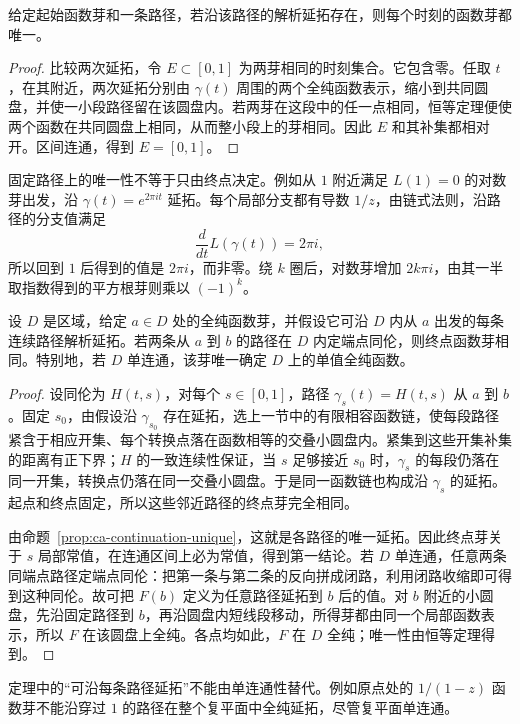\begin{proposition}[固定路径上的唯一性]
\label{prop:ca-continuation-unique}
给定起始函数芽和一条路径，若沿该路径的解析延拓存在，则每个时刻的函数芽都唯一。
\end{proposition}
\begin{proof}
比较两次延拓，令 $E\subset[0,1]$ 为两芽相同的时刻集合。它包含零。任取 $t$，在其附近，两次延拓分别由 $\gamma(t)$ 周围的两个全纯函数表示，缩小到共同圆盘，并使一小段路径留在该圆盘内。若两芽在这段中的任一点相同，恒等定理便使两个函数在共同圆盘上相同，从而整小段上的芽相同。因此 $E$ 和其补集都相对开。区间连通，得到 $E=[0,1]$。
\end{proof}

固定路径上的唯一性不等于只由终点决定。例如从 $1$ 附近满足 $L(1)=0$ 的对数芽出发，沿 $\gamma(t)=e^{2\pi it}$ 延拓。每个局部分支都有导数 $1/z$，由链式法则，沿路径的分支值满足
\[
 \frac{d}{dt}L(\gamma(t))=2\pi i,
\]
所以回到 $1$ 后得到的值是 $2\pi i$，而非零。绕 $k$ 圈后，对数芽增加 $2k\pi i$，由其一半取指数得到的平方根芽则乘以 $(-1)^k$。

\begin{theorem}
\label{thm:ca-monodromy}
设 $D$ 是区域，给定 $a\in D$ 处的全纯函数芽，并假设它可沿 $D$ 内从 $a$ 出发的每条连续路径解析延拓。若两条从 $a$ 到 $b$ 的路径在 $D$ 内定端点同伦，则终点函数芽相同。特别地，若 $D$ 单连通，该芽唯一确定 $D$ 上的单值全纯函数。
\end{theorem}
\begin{proof}
设同伦为 $H(t,s)$，对每个 $s\in[0,1]$，路径 $\gamma_s(t)=H(t,s)$ 从 $a$ 到 $b$。固定 $s_0$，由假设沿 $\gamma_{s_0}$ 存在延拓，选上一节中的有限相容函数链，使每段路径紧含于相应开集、每个转换点落在函数相等的交叠小圆盘内。紧集到这些开集补集的距离有正下界；$H$ 的一致连续性保证，当 $s$ 足够接近 $s_0$ 时，$\gamma_s$ 的每段仍落在同一开集，转换点仍落在同一交叠小圆盘。于是同一函数链也构成沿 $\gamma_s$ 的延拓。起点和终点固定，所以这些邻近路径的终点芽完全相同。

由命题~\ref{prop:ca-continuation-unique}，这就是各路径的唯一延拓。因此终点芽关于 $s$ 局部常值，在连通区间上必为常值，得到第一结论。若 $D$ 单连通，任意两条同端点路径定端点同伦：把第一条与第二条的反向拼成闭路，利用闭路收缩即可得到这种同伦。故可把 $F(b)$ 定义为任意路径延拓到 $b$ 后的值。对 $b$ 附近的小圆盘，先沿固定路径到 $b$，再沿圆盘内短线段移动，所得芽都由同一个局部函数表示，所以 $F$ 在该圆盘上全纯。各点均如此，$F$ 在 $D$ 全纯；唯一性由恒等定理得到。
\end{proof}

定理中的“可沿每条路径延拓”不能由单连通性替代。例如原点处的 $1/(1-z)$ 函数芽不能沿穿过 $1$ 的路径在整个复平面中全纯延拓，尽管复平面单连通。

